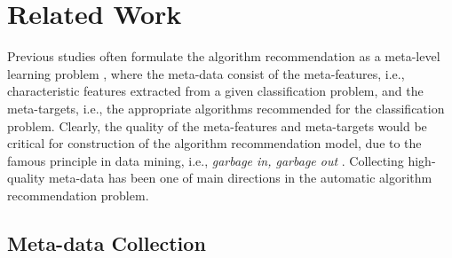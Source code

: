 \documentclass[prodmode,acmtkdd]{acmsmall}
\begin{document}
\section{Related Work}\label{sec:relatedwork}


Previous studies often formulate the algorithm recommendation as a meta-level learning problem \cite{rice1975algorithm,smith2008cross},
where the meta-data consist of the meta-features, i.e., characteristic features extracted from a given classification problem, and
the meta-targets, i.e., the appropriate algorithms recommended for the classification problem.
Clearly, the quality of the meta-features and meta-targets would be critical for construction of the algorithm recommendation model, due to the famous principle in data mining, i.e., \textit{garbage in, garbage out} \cite{lee1999cleansing}.
Collecting high-quality meta-data has been one of main directions in the automatic algorithm recommendation problem.



%
%



\subsection{Meta-data Collection}
\end{document}
